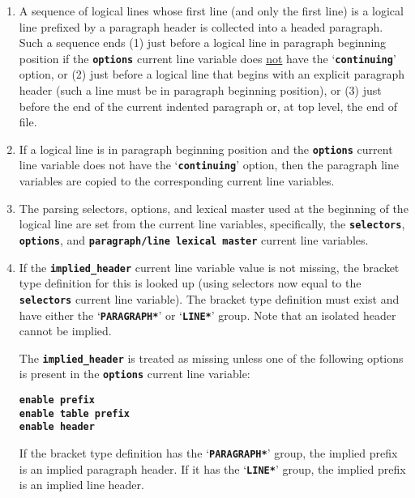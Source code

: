 \documentclass[12pt]{article}
\newcommand{\TT}[1]{{\tt \bfseries #1}}
\newcommand{\EOL}{\penalty \exhyphenpenalty}
\begin{document}
\begin{enumerate}

\item
A sequence of logical lines whose first line (and only the first line)
is a logical line prefixed by a paragraph header is collected into a
headed paragraph.  Such a sequence ends (1) just before a logical
line in paragraph beginning position if the \TT{options} current line
variable does \underline{not} have the `\TT{continuing}' option, or
(2) just before a logical line that begins with an explicit paragraph
header (such a line must be in paragraph beginning position),
or (3) just before the end of the current indented paragraph
or, at top level, the end of file.

\item\label{CONTINUING-RULE}
If a logical line is in paragraph beginning position and the
\TT{options} current line variable does not have the `\TT{continuing}'
option, then the paragraph line variables are copied
to the corresponding current line variables.

\item The parsing selectors, options, and lexical master used at the
beginning of the logical line are set from the current line variables,
specifically, the
\TT{selectors},
\TT{options}, and \TT{para\-graph/\EOL line lexical master}
current line variables.

\item\label{IMPLIED-HEADER-PARSING}
If the \TT{implied\_header} current line variable value is not missing,
the bracket type definition for this is looked up (using selectors now
equal to the \TT{selectors} current line variable).
The bracket type definition must exist and have either the `\TT{*PARAGRAPH*}' or
`\TT{*LINE*}' group.  Note that an isolated header cannot be implied.

The \TT{implied\_header} is treated as missing unless one of the
following options is present in the \TT{options} current line variable:
\begin{center}
\TT{enable prefix} \\
\TT{enable table prefix} \\
\TT{enable header} \\
\end{center}

If the bracket type definition has the `\TT{*PARAGRAPH*}' group, the
implied prefix is an implied paragraph header.
If it has the `\TT{*LINE*}' group,
the implied prefix is an implied line header.


\end{enumerate}
\end{document}
